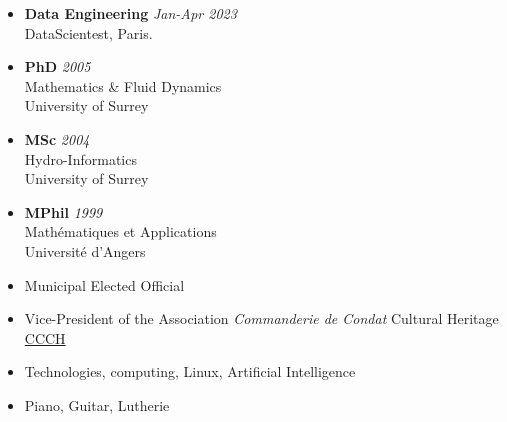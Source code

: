 \documentclass[11 pt,oneside,a4paper,titlepage]{article}
\begin{document}
{\begin{minipage}{6.3cm}
        \begin{itemize}[leftmargin=*]
            \item {\textbf{Data Engineering} \textit{Jan-Apr 2023}\\
                  DataScientest, Paris.}
            \item {\textbf{PhD} \textit{2005} \\
                  Mathematics \& Fluid Dynamics\\
                  University of Surrey}
            \item {\textbf{MSc} \textit{2004} \\
                  Hydro-Informatics\\
                  University of Surrey}
                  \item{\textbf{MPhil} \textit{1999} \\
                              Mathématiques et Applications\\
                              Université d'Angers}
        \end{itemize}

        \begin{itemize}[leftmargin=*]
            \item{Municipal Elected Official}
            \item{Vice-President of the Association \textit{Commanderie de Condat} Cultural Heritage \href{https://commanderiecondat.fr/}{CCCH}}
            \item{Technologies, computing, Linux, Artificial Intelligence}
            \item{Piano, Guitar, Lutherie}
        \end{itemize}
    \end{minipage}} %
\hfill
\end{document}
